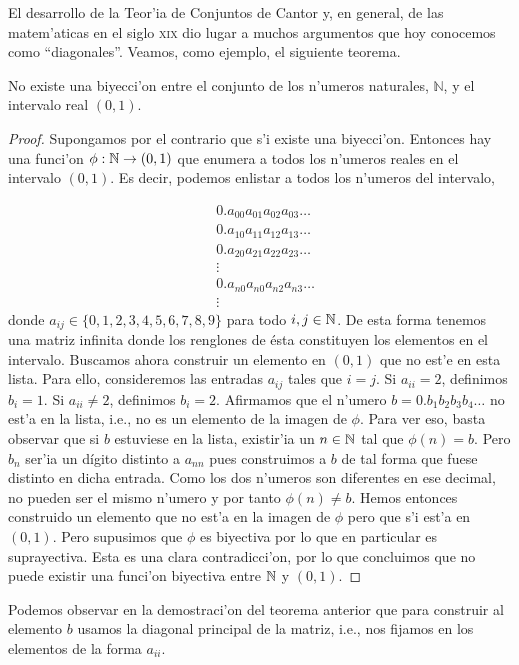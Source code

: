 
El desarrollo de la Teor'ia de Conjuntos de Cantor y, en general, de las matem'aticas en el siglo \textsc{xix} dio lugar a muchos argumentos que hoy conocemos como \enquote{diagonales}. Veamos, como ejemplo, el siguiente teorema.

\begin{teo*}
No existe una biyecci'on entre el conjunto de los n'umeros naturales, $\mathbb {N}$, y el intervalo real $(0,1)$.    
\end{teo*}
\begin{proof}
    Supongamos por el contrario que s'i existe una biyecci'on. Entonces hay una funci'on $\phi: 
    \mathbb N \to (0,1)$ que enumera a todos los n'umeros reales en el intervalo $(0,1)$. Es decir, podemos enlistar a todos los n'umeros del intervalo, 

    
    \begin{align*}
        &0.a_{00}a_{01}a_{02}a_{03}\dots\\
        &0.a_{10}a_{11}a_{12}a_{13}\dots\\
        &0.a_{20}a_{21}a_{22}a_{23}\dots\\
        &\vdots\\
        &0.a_{n0}a_{n0}a_{n2}a_{n3}\dots \\
        &\vdots
    \end{align*}
    donde $a_{ij}\in \{0,1,2,3,4,5,6,7,8,9\}$ para todo $i,j\in \mathbb N$. De esta forma tenemos una matriz infinita donde los renglones de ésta constituyen los elementos en el intervalo. Buscamos ahora construir un elemento en $(0,1)$ que no est'e en esta lista. Para ello, consideremos las entradas $a_{ij}$ tales que $i=j$. Si $a_{ii} = 2$, definimos $b_i = 1$. Si $a_{ii}\neq 2$, definimos $b_i=2$. Afirmamos que el n'umero $b=0.b_1b_2b_3b_4\dots$ no est'a en la lista, i.e., no es un elemento de la imagen  de $\phi$. Para ver eso, basta observar que si $b$ estuviese en la lista, existir'ia un $n
    \in \mathbb N$ tal que $\phi(n) = b$. Pero $b_n$ ser'ia un dígito distinto a $a_{nn}$ pues construimos a $b$ de tal forma que fuese distinto en dicha entrada. Como los dos n'umeros son diferentes en ese decimal, no pueden ser el mismo n'umero y por tanto $\phi(n)\neq b$. Hemos entonces construido un elemento que no est'a en la imagen de $\phi$ pero que s'i est'a en $(0,1)$. Pero supusimos que $\phi$ es biyectiva por lo que en particular es suprayectiva. Esta es una clara contradicci'on, por lo que concluimos que no puede existir una funci'on biyectiva entre $\mathbb N$ y $(0,1)$.      
\end{proof}
Podemos observar en la demostraci'on del teorema anterior que para construir al elemento $b$ usamos la diagonal principal de la matriz, i.e., nos fijamos en los elementos de la forma $a_{ii}$. 


